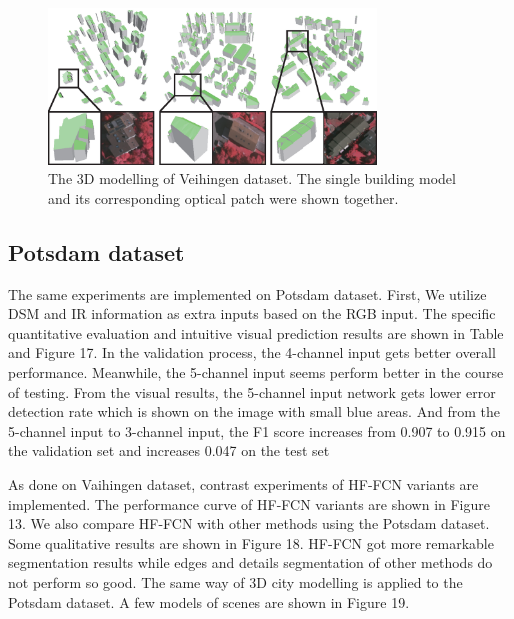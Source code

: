 \begin{figure}
\centering
\includegraphics[width=8.7cm]{Figures/Vaihigen_3Dmodelling.eps}
\caption{The 3D modelling of Veihingen dataset. The single building model and its corresponding optical patch were shown together.}
\label{16}
\end{figure}



\subsection{Potsdam dataset}
 The same experiments are implemented on Potsdam dataset. First, We utilize DSM and IR information as extra inputs based on the RGB input. The specific quantitative evaluation and intuitive visual prediction results are shown in Table and Figure 17. In the validation process, the 4-channel input gets better overall performance. Meanwhile, the 5-channel input seems perform better in the course of testing. From the visual results, the 5-channel input network gets lower error detection rate which is shown on the image with small blue areas. And from the 5-channel input to 3-channel input, the F1 score increases from 0.907 to 0.915 on the validation set and increases 0.047 on the test set \par
 \setlength{\parindent}{2ex} As done on Vaihingen dataset, contrast experiments of HF-FCN variants are implemented. The performance curve of HF-FCN variants are shown in Figure 13. We also compare HF-FCN with other methods using the Potsdam dataset. Some qualitative results are shown in Figure 18. HF-FCN got more remarkable segmentation results while edges and details segmentation of other methods do not perform so good. The same way of 3D city modelling is applied to the Potsdam dataset. A few models of scenes are shown in Figure 19.

